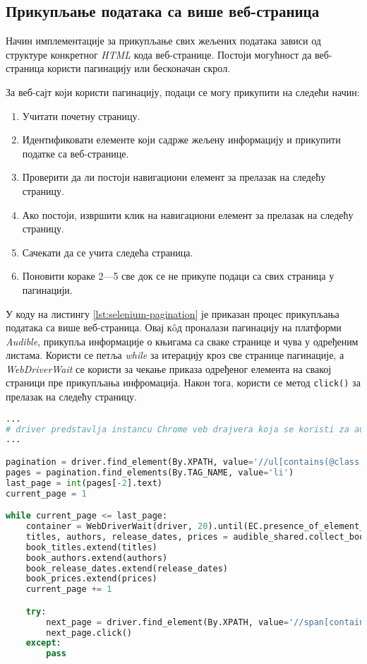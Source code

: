 \documentclass[12pt,oneside]{memoir}
\begin{document}
\subsection{Прикупљање података са више веб-страница}
Начин имплементације за прикупљање свих жељених података зависи од структуре конкретног 
\textit{HTML} кода веб-странице. Постоји могућност да веб-страница користи пагинацију или бесконачан скрол.

За веб-сајт који користи пагинацију, подаци се могу прикупити на следећи начин:
\begin{enumerate}
  \item Учитати почетну страницу.
  \item Идентификовати елементе који садрже жељену информацију и прикупити податке са веб-странице.
  \item Проверити да ли постоји навигациони елемент за прелазак на следећу страницу.
  \item Ако постоји, извршити клик на навигациони елемент за прелазак на следећу страницу.
  \item Сачекати да се учита следећа страница.
  \item Поновити кораке 2---5 све док се не прикупе подаци са свих страница у пагинацији.
\end{enumerate}

У коду на листингу \ref{lst:selenium-pagination} је приказан процес прикупљања података са више веб-страница. Овај кôд проналази пагинацију на платформи \textit{Audible}, прикупља информације о књигама са сваке странице и чува у одређеним листама. Користи се петља \textit{while} за итерацију кроз све странице пагинације, а \textit{WebDriverWait} се користи за чекање приказа одређеног елемента на свакој страници пре прикупљања инфромација. Након тога, користи се метод \texttt{click()} за прелазак на следећу страницу.

\begin{lstlisting}[language=Python, caption={Пагинација у оквиру библиотеке \textit{Selenium}}, label={lst:selenium-pagination}]
...
# driver predstavlja instancu Chrome veb drajvera koja se koristi za automatizaciju pregledaca
...

pagination = driver.find_element(By.XPATH, value='//ul[contains(@class, "pagingElements")]')
pages = pagination.find_elements(By.TAG_NAME, value='li')
last_page = int(pages[-2].text)
current_page = 1

while current_page <= last_page:
    container = WebDriverWait(driver, 20).until(EC.presence_of_element_located((By.CLASS_NAME, 'adbl-impression-container ')))
    titles, authors, release_dates, prices = audible_shared.collect_books_info(container)
    book_titles.extend(titles)
    book_authors.extend(authors)
    book_release_dates.extend(release_dates)
    book_prices.extend(prices)
    current_page += 1

    try:
        next_page = driver.find_element(By.XPATH, value='//span[contains(@class, "nextButton")]')
        next_page.click()
    except: 
        pass
\end{lstlisting}
\end{document}

